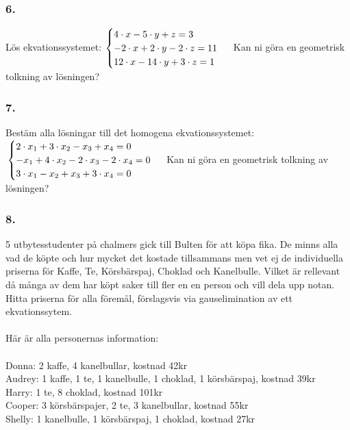\documentclass{article}
\begin{document}
\subsubsection*{6.}
Lös ekvationssystemet:
\begin{math}
	\begin{cases}
	4 \cdot x - 5 \cdot y  + z = 3 \\
	-2 \cdot x + 2 \cdot y - 2 \cdot z = 11 \\
	12 \cdot x - 14 \cdot y  + 3 \cdot z = 1 \\
	\end{cases}
	\\
	\\
\end{math}
Kan ni göra en geometrisk tolkning av lösningen?


\subsubsection*{7.}
Bestäm alla lösningar till det homogena ekvationssystemet:
\begin{math}
	\\
	\begin{cases}
	2 \cdot x_1 + 3 \cdot x_2  - x_3 + x_4 = 0 \\
	-x_1 + 4 \cdot x_2 -2 \cdot x_3 -2 \cdot x_4 = 0 \\
	3 \cdot x_1 - x_2  + x_3 + 3 \cdot x_4 = 0 \\
	\end{cases}
	\\
	\\
\end{math}
Kan ni göra en geometrisk tolkning av lösningen?

\subsubsection*{8.}
5 utbytesstudenter på chalmers gick till Bulten för att köpa fika. De minns alla vad de köpte och hur mycket det kostade tillsammans men vet ej de individuella priserna för Kaffe, Te, Körsbärspaj, Choklad och Kanelbulle. Vilket är rellevant då många av dem har köpt saker till fler en en person och vill dela upp notan. Hitta priserna för alla föremål, förslagsvis via gauselimination av ett ekvationssytem.
\\\\
Här är alla personernas information:
\\\\
Donna: 2 kaffe, 4 kanelbullar, kostnad 42kr \\
Audrey: 1 kaffe, 1 te, 1 kanelbulle, 1 choklad, 1 körsbärspaj, kostnad 39kr \\
Harry: 1 te, 8 choklad, kostnad 101kr \\
Cooper: 3 körsbärspajer, 2 te, 3 kanelbullar, kostnad 55kr \\ 
Shelly: 1 kanelbulle, 1 körsbärspaj, 1 choklad, kostnad 27kr
\end{document}
